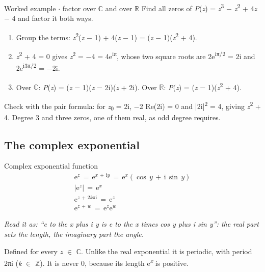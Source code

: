\documentclass[11pt]{article}
\begin{document}
\begin{keepsection}
\begin{keepsection}
\begin{workedbox}{Worked example \ensuremath{\cdot} factor over \ensuremath{\mathbb{C}} and over \ensuremath{\mathbb{R}}}
Find all zeros of \textit{P}(\textit{z}) = \textit{z}\textsuperscript{3} \ensuremath{-} \textit{z}\textsuperscript{2} + 4\textit{z} \ensuremath{-} 4 and factor it both ways.

\begin{enumerate}
\item Group the terms: \textit{z}\textsuperscript{2}(\textit{z} \ensuremath{-} 1) + 4(\textit{z} \ensuremath{-} 1) = (\textit{z} \ensuremath{-} 1)(\textit{z}\textsuperscript{2} + 4).
\item \textit{z}\textsuperscript{2} + 4 = 0 gives \textit{z}\textsuperscript{2} = \ensuremath{-}4 = 4e\textsuperscript{iπ}, whose two square roots are 2e\textsuperscript{iπ/2} = 2i and 2e\textsuperscript{i3π/2} = \ensuremath{-}2i.
\item Over \ensuremath{\mathbb{C}}: \textit{P}(\textit{z}) = (\textit{z} \ensuremath{-} 1)(\textit{z} \ensuremath{-} 2i)(\textit{z} + 2i). Over \ensuremath{\mathbb{R}}: \textit{P}(\textit{z}) = (\textit{z} \ensuremath{-} 1)(\textit{z}\textsuperscript{2} + 4).
\end{enumerate}

Check with the pair formula: for \textit{z}\textsubscript{0} = 2i, \ensuremath{-}2 Re(2i) = 0 and |2i|\textsuperscript{2} = 4, giving \textit{z}\textsuperscript{2} + 4. Degree 3 and three zeros, one of them real, as odd degree requires.
\end{workedbox}
\end{keepsection}

\begin{keepsection}
\subsection{The complex exponential}

\begin{equationcard}{Complex exponential function}
\[ \begin{gathered} \mathrm{e}^{{z}}\, =\, \mathrm{e}^{{x}\, +\, \mathrm{i}{y}}\, =\, \mathrm{e}^{{x}}(\cos \, {y}\, +\, \mathrm{i}\, \sin \, {y}) \\ |\mathrm{e}^{{z}}|\, =\, \mathrm{e}^{{x}} \\ \mathrm{e}^{{z}\, +\, 2{k}π\mathrm{i}}\, =\, \mathrm{e}^{{z}} \\ \mathrm{e}^{{z}\, +\, {w}}\, =\, \mathrm{e}^{{z}}\mathrm{e}^{{w}} \end{gathered} \]
{\small \emph{Read it as: “e to the x plus i y is e to the x times cos y plus i sin y”: the real part sets the length, the imaginary part the angle.}\par Defined for every \textit{z} \ensuremath{\in} \ensuremath{\mathbb{C}}. Unlike the real exponential it is periodic, with period 2πi (\textit{k} \ensuremath{\in} \ensuremath{\mathbb{Z}}). It is never 0, because its length e\textsuperscript{\textit{x}} is positive.}
\end{equationcard}


\end{keepsection}
\end{keepsection}
\end{document}
